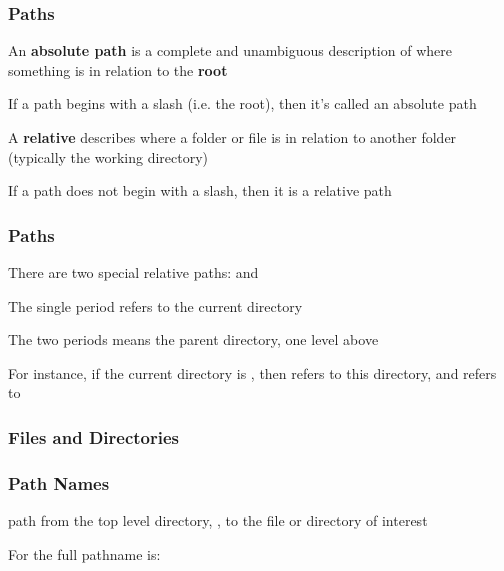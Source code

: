\documentclass[12pt]{beamer}\usepackage[]{graphicx}\usepackage[]{color}
\begin{document}

\begin{frame}
\frametitle{Paths}
\bi
  \item An \textbf{absolute path} is a complete and unambiguous description of where something is in relation to the \textbf{root}
  \item If a path begins with a slash (i.e. the root), then it's called an absolute path
  \item A \textbf{relative} describes where a folder or file is in relation to another folder (typically the working directory)
  \item If a path does not begin with a slash, then it is a relative path
\ei
\end{frame}


\begin{frame}
\frametitle{Paths}
\bi
  \item There are two special relative paths:  and 
  \item The single period  refers to the current directory
  \item The two periods means the parent directory, one level above
  \item For instance, if the current directory is , then  refers to this directory, and  refers to 
\ei
\end{frame}


\begin{frame}[fragile]
\frametitle{Files and Directories}
\begin{center}
\end{center}
\end{frame}


\begin{frame}[fragile]
\frametitle{Path Names}

\bi
  \item path from the top level directory, \code{/}, to the file or directory of interest
  \item For  the full pathname is: 
\ei
\eb

\end{frame}
\end{document}
